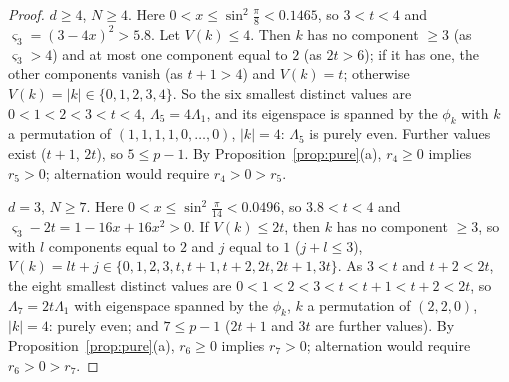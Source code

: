 \documentclass[11pt,a4paper]{article}
\theoremstyle{plain}
\theoremstyle{definition}
\numberwithin{equation}{section}
\begin{document}
\begin{proof}
$d\ge4$, $N\ge4$. Here $0<x\le\sin^2\frac\pi8<0.1465$, so $3<t<4$ and $\varsigma_3=(3-4x)^2>5.8$. Let $V(k)\le4$. Then $k$ has no component $\ge3$ (as $\varsigma_3>4$) and at most one component equal to $2$ (as $2t>6$); if it has one, the other components vanish (as $t+1>4$) and $V(k)=t$; otherwise $V(k)=|k|\in\{0,1,2,3,4\}$. So the six smallest distinct values are $0<1<2<3<t<4$, $\Lambda_5=4\Lambda_1$, and its eigenspace is spanned by the $\phi_k$ with $k$ a permutation of $(1,1,1,1,0,\dots,0)$, $|k|=4$: $\Lambda_5$ is purely even. Further values exist ($t+1$, $2t$), so $5\le p-1$. By Proposition~\ref{prop:pure}(a), $r_4\ge0$ implies $r_5>0$; alternation would require $r_4>0>r_5$.

$d=3$, $N\ge7$. Here $0<x\le\sin^2\frac\pi{14}<0.0496$, so $3.8<t<4$ and $\varsigma_3-2t=1-16x+16x^2>0$. If $V(k)\le2t$, then $k$ has no component $\ge3$, so with $l$ components equal to $2$ and $j$ equal to $1$ ($j+l\le3$), $V(k)=lt+j\in\{0,1,2,3,t,t+1,t+2,2t,2t+1,3t\}$. As $3<t$ and $t+2<2t$, the eight smallest distinct values are $0<1<2<3<t<t+1<t+2<2t$, so $\Lambda_7=2t\Lambda_1$ with eigenspace spanned by the $\phi_k$, $k$ a permutation of $(2,2,0)$, $|k|=4$: purely even; and $7\le p-1$ ($2t+1$ and $3t$ are further values). By Proposition~\ref{prop:pure}(a), $r_6\ge0$ implies $r_7>0$; alternation would require $r_6>0>r_7$.
\end{proof}
\end{document}
